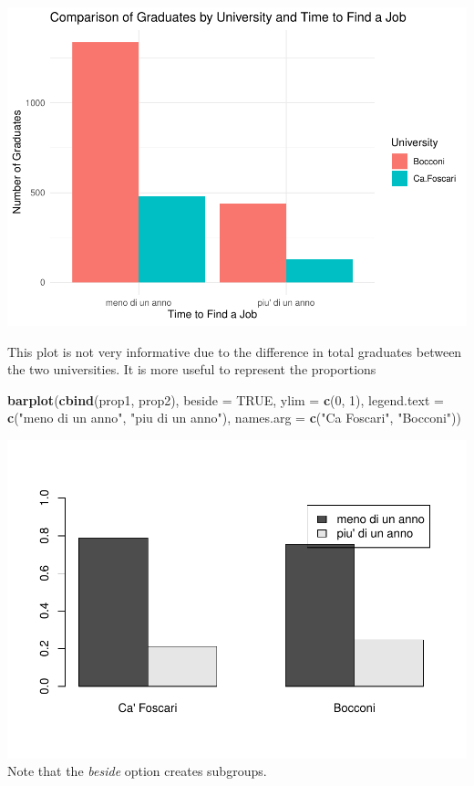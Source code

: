 \documentclass[
]{article}
\newenvironment{Shaded}{\begin{snugshade}}{\end{snugshade}}
\newcommand{\AttributeTok}[1]{\textcolor[rgb]{0.13,0.29,0.53}{#1}}
\newcommand{\ConstantTok}[1]{\textcolor[rgb]{0.56,0.35,0.01}{#1}}
\newcommand{\DecValTok}[1]{\textcolor[rgb]{0.00,0.00,0.81}{#1}}
\newcommand{\FunctionTok}[1]{\textcolor[rgb]{0.13,0.29,0.53}{\textbf{#1}}}
\newcommand{\NormalTok}[1]{#1}
\newcommand{\StringTok}[1]{\textcolor[rgb]{0.31,0.60,0.02}{#1}}
\begin{document}
\includegraphics{Hypothesis_Testing_files/figure-latex/unnamed-chunk-42-2.pdf}

This plot is not very informative due to the difference in total
graduates between the two universities. It is more useful to represent
the proportions

\begin{Shaded}
\begin{Highlighting}[]
\FunctionTok{barplot}\NormalTok{(}\FunctionTok{cbind}\NormalTok{(prop1, prop2), }\AttributeTok{beside =} \ConstantTok{TRUE}\NormalTok{, }\AttributeTok{ylim =} \FunctionTok{c}\NormalTok{(}\DecValTok{0}\NormalTok{, }\DecValTok{1}\NormalTok{),}
       \AttributeTok{legend.text =} \FunctionTok{c}\NormalTok{(}\StringTok{"meno di un anno"}\NormalTok{, }\StringTok{"piu\textquotesingle{} di un anno"}\NormalTok{),}
       \AttributeTok{names.arg =} \FunctionTok{c}\NormalTok{(}\StringTok{"Ca\textquotesingle{} Foscari"}\NormalTok{, }\StringTok{"Bocconi"}\NormalTok{))}
\end{Highlighting}
\end{Shaded}

\includegraphics{Hypothesis_Testing_files/figure-latex/unnamed-chunk-43-1.pdf}
Note that the \emph{beside} option creates subgroups.
\end{document}
